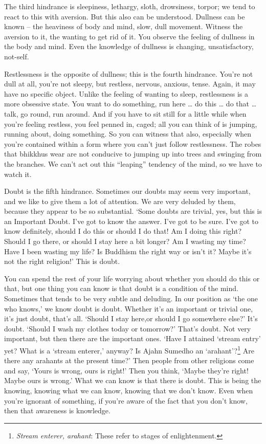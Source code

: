The third hindrance is sleepiness, lethargy, sloth, drowsiness, torpor; we tend to react to this with aversion. But this also can be understood. Dullness can be known -- the heaviness of body and mind, slow, dull movement. Witness the aversion to it, the wanting to get rid of it. You observe the feeling of dullness in the body and mind. Even the knowledge of dullness is changing, unsatisfactory, not-self.

Restlessness is the opposite of dullness; this is the fourth hindrance. You're not dull at all, you're not sleepy, but restless, nervous, anxious, tense. Again, it may have no specific object. Unlike the feeling of wanting to sleep, restlessness is a more obsessive state. You want to do something, run here \ldots{} do this \ldots{} do that \ldots{} talk, go round, run around. And if you have to sit still for a little while when you're feeling restless, you feel penned in, caged; all you can think of is jumping, running about, doing something. So you can witness that also, especially when you're contained within a form where you can't just follow restlessness. The robes that bhikkhus wear are not conducive to jumping up into trees and swinging from the branches. We can't act out this ``leaping'' tendency of the mind, so we have to watch it.

Doubt is the fifth hindrance. Sometimes our doubts may seem very important, and we like to give them a lot of attention. We are very deluded by them, because they appear to be so substantial. `Some doubts are trivial, yes, but this is an Important Doubt. I've got to know the answer. I've got to be sure. I've got to know definitely, should I do this or should I do that! Am I doing this right? Should I go there, or should I stay here a bit longer? Am I wasting my time? Have I been wasting my life? Is Buddhism the right way or isn't it? Maybe it's not the right religion!' This is doubt.

You can spend the rest of your life worrying about whether you should do this or that, but one thing you can know is that doubt is a condition of the mind. Sometimes that tends to be very subtle and deluding. In our position as `the one who knows,' we know doubt is doubt. Whether it's an important or trivial one, it's just doubt, that's all. `Should I stay here,or should I go somewhere else?' It's doubt. `Should I wash my clothes today or tomorrow?' That's doubt. Not very important, but then there are the important ones. `Have I attained `stream entry' yet? What is a `stream enterer,' anyway? Is Ajahn Sumedho an `arahant'?\footnote{\textit{Stream enterer, arahant}: These refer to stages of enlightenment.} Are there any arahants at the present time?' Then people from other religions come and say, `Yours is wrong, ours is right!' Then you think, `Maybe they're right! Maybe ours is wrong.' What we can know is that there is doubt. This is being the knowing, knowing what we can know, knowing that we don't know. Even when you're ignorant of something, if you're aware of the fact that you don't know, then that awareness is knowledge.

